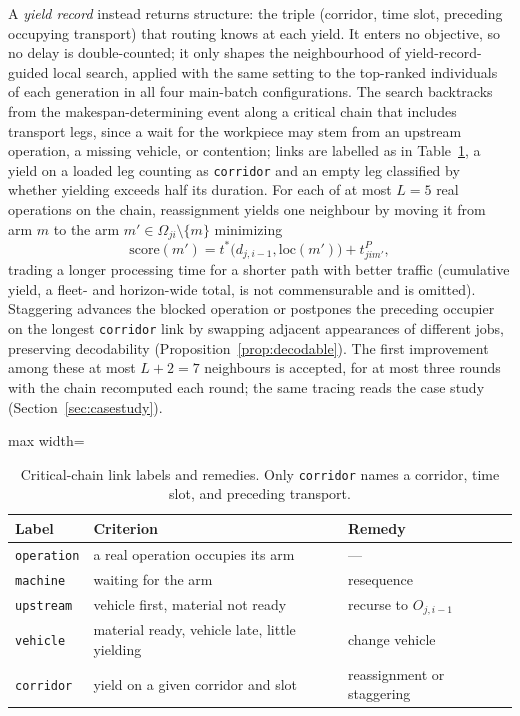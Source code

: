 \documentclass[preprint,review,12pt,authoryear,doubleblind]{elsarticle}
\begin{document}
A \emph{yield record} instead returns structure: the triple (corridor, time slot, preceding occupying transport) that routing knows at each yield.
It enters no objective, so no delay is double-counted; it only shapes the neighbourhood of yield-record-guided local search, applied with the same setting to the top-ranked individuals of each generation in all four main-batch configurations.
The search backtracks from the makespan-determining event along a critical chain that includes transport legs, since a wait for the workpiece may stem from an upstream operation, a missing vehicle, or contention; links are labelled as in Table~\ref{tab:attrib}, a yield on a loaded leg counting as \texttt{corridor} and an empty leg classified by whether yielding exceeds half its duration.
For each of at most $L=5$ real operations on the chain, reassignment yields one neighbour by moving it from arm $m$ to the arm $m'\in\Omega_{ji}\setminus\{m\}$ minimizing
\begin{equation}
\label{eq:reassign}
\mathrm{score}(m')=t^{*}\bigl(d_{j,i-1},\mathrm{loc}(m')\bigr)+t^{P}_{jim'},
\end{equation}
trading a longer processing time for a shorter path with better traffic (cumulative yield, a fleet- and horizon-wide total, is not commensurable and is omitted).
Staggering advances the blocked operation or postpones the preceding occupier on the longest \texttt{corridor} link by swapping adjacent appearances of different jobs, preserving decodability (Proposition~\ref{prop:decodable}).
The first improvement among these at most $L+2=7$ neighbours is accepted, for at most three rounds with the chain recomputed each round; the same tracing reads the case study (Section~\ref{sec:casestudy}).

\begin{table}[!htbp]
\caption{Critical-chain link labels and remedies. Only \texttt{corridor} names a corridor, time slot, and preceding transport.}
\label{tab:attrib}
\footnotesize
\begin{adjustbox}{max width=\linewidth}\begin{tabular}{@{}llp{2.3cm}@{}}
\toprule
Label & Criterion & Remedy \\
\midrule
\texttt{operation} & a real operation occupies its arm & --- \\
\texttt{machine} & waiting for the arm & resequence \\
\texttt{upstream} & vehicle first, material not ready & recurse to $O_{j,i-1}$ \\
\texttt{vehicle} & material ready, vehicle late, little yielding & change vehicle \\
\texttt{corridor} & yield on a given corridor and slot & reassignment or staggering \\
\bottomrule
\end{tabular}\end{adjustbox}
\end{table}
\end{document}
